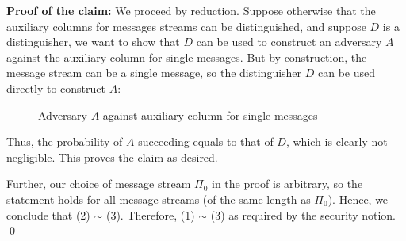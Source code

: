 \documentclass[10pt]{article}
\begin{document}
\textbf{Proof of the claim: } We proceed by reduction. Suppose otherwise that the auxiliary columns for messages streams can be distinguished, and suppose $D$ is a distinguisher, we want to show that $D$ can be used to construct an adversary $A$ against the auxiliary column for single messages. But by construction, the message stream can be a single message, so the distinguisher $D$ can be used directly to construct $A$:
\begin{figure}[H]
	\begin{center}
		\caption{Adversary $A$ against auxiliary column for single messages}
	\end{center}
\end{figure}

Thus, the probability of $A$ succeeding equals to that of $D$, which is clearly not negligible. This proves the claim as desired.

Further, our choice of message stream $\Pi_0$ in the proof is arbitrary, so the statement holds for all message streams (of the same length as $\Pi_0$). Hence, we conclude that (2) $\sim$ (3). Therefore, (1) $\sim$ (3) as required by the security notion. \qed
\end{document}
